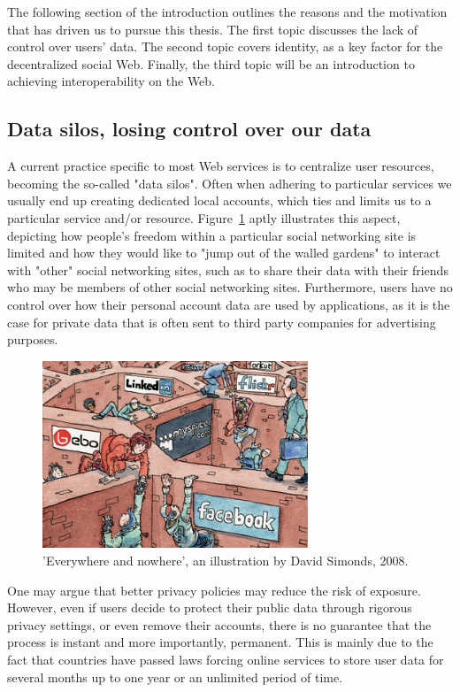The following section of the introduction outlines the reasons and the motivation that has driven us to pursue this thesis. The first topic discusses the lack of control over users' data. The second topic covers identity, as a key factor for the decentralized social Web. Finally, the third topic will be an introduction to achieving interoperability on the Web.

\subsection{Data silos, losing control over our data}
\label{subsec:intro-silos}
A current practice specific to most Web services is to centralize user resources, becoming the so-called "data silos". Often when adhering to particular services we usually end up creating dedicated local accounts, which ties and limits us to a particular service and/or resource. Figure~\ref{fig:wall_garden} aptly illustrates this aspect, depicting how people's freedom within a particular social networking site is limited and how they would like to "jump out of the walled gardens" to interact with "other" social networking sites, such as to share their data with their friends who may be members of other social networking sites. Furthermore, users have no control over how their personal account data are used by applications, as it is the case for private data that is often sent to third party companies for advertising purposes.

\begin{figure}[h]
  \begin{center}
    \includegraphics[width=300px]{img/walled_garden.jpg}
        \caption{'Everywhere and nowhere', an illustration by David Simonds, 2008.}
        \label{fig:wall_garden}
  \end{center}
\end{figure}

One may argue that better privacy policies may reduce the risk of exposure. However, even if users decide to protect their public data through rigorous privacy settings, or even remove their accounts, there is no guarantee that the process is instant and more importantly, permanent. This is mainly due to the fact that countries have passed laws forcing online services to store user data for several months up to one year or an unlimited period of time.\\

